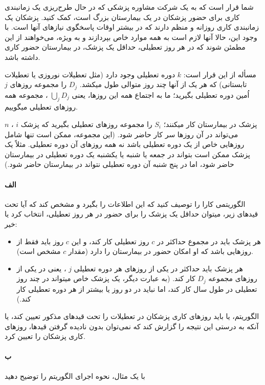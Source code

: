\documentclass[]{article}
\begin{document}
شما قرار است که به یک شرکت مشاوره پزشکی که در حال طرح‌ریزی یک زمانبندی کاری برای حضور پزشکان در یک بیمارستان بزرگ است، کمک کنید.
پزشکان یک زمانبندی کاری روزانه و منظم دارند که در بیشتر اوقات پاسخگوی نیازهای آنها است. 
با وجود این، حالا آنها لازم است به همه موارد خاص بپردازند و به ویژه، می‌خواهند از این مطمئن شوند
که در هر روز تعطیلی، حداقل یک پزشک، در بیمارستان حضور کاری داشته باشد.

مسأله از این قرار است: 
$k$ دوره تعطیلی وجود دارد (مثل تعطیلات نوروزی یا تعطیلات تابستانی) که هر یک از آنها چند روز متوالی طول میکشد.
$D_j$ را مجموعه روزهای $j$ اُمین دوره تعطیلی بگیرید؛
ما به اجتماع همه این روزها، یعنی $\bigcup_j D_j$ ، مجموعه همه روزهای تعطیلی میگوییم.

$n$ پزشک در بیمارستان کار میکنند؛
$S_i$ را مجموعه روزهای تعطیلی بگیرید که پزشک $i$ ، می‌تواند در آن روزها سر کار حاضر شود.
(این مجموعه، ممکن است تنها شامل روزهایی خاص از یک دوره تعطیلی باشد نه همه روزهای آن دوره تعطیلی. 
مثلاً یک پزشک ممکن است بتواند در جمعه یا شنبه یا یکشنبه یک دوره تعطیلی در بیمارستان حاضر شود،
اما در پنج شنبه آن دوره تعطیلی نتواند در بیمارستان حاضر شود.)

\paragraph*{الف}
الگوریتمی کارا را توصیف کنید که این اطلاعات را بگیرد و مشخص کند که آیا تحت قیدهای زیر،
میتوان حداقل یک پزشک را برای حضور در هر روز تعطیلی، انتخاب کرد یا خیر:
\begin{itemize}
    \item هر پزشک باید در مجموع حداکثر در $c$ روز تعطیلی کار کند،
    و این $c$ روز باید فقط از روزهایی باشد که او امکان حضور در بیمارستان را دارد (مقدار $c$ مشخص است).

    \item هر پزشک باید حداکثر در یکی از روزهای هر دوره تعطیلی $j$ ، 
    یعنی در یکی از روزهای مجموعه $D_j$ کار کند.
    (به عبارت دیگر، یک پزشک خاص میتواند در چند روز تعطیلی در طول سال کار کند،
    اما نباید در دو روز یا بیشتر از هر دوره تعطیلی کار کند.) 
\end{itemize}
الگوریتم، یا باید روزهای کاری پزشکان در تعطیلات را تحت قیدهای مذکور تعیین کند،
یا آنکه به درستی این نتیجه را گزارش کند که
نمی‌توان بدون نادیده گرفتن قیدها، روزهای کاری پزشکان را تعیین کرد. 

\paragraph*{ب}
با یک مثال، نحوه اجرای الگوریتم را توضیح دهید
\end{document}

